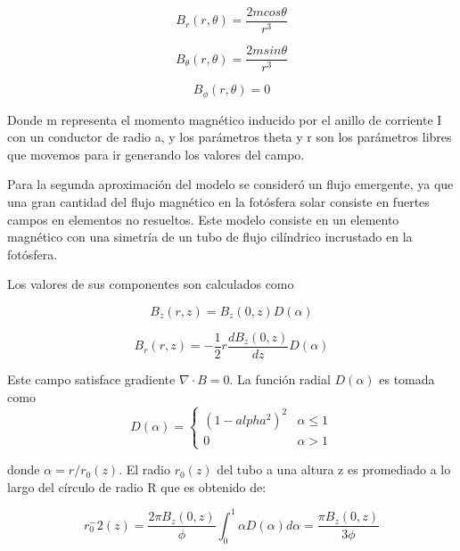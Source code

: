 \documentclass[9pt]{book}
\begin{document}
\begin{equation}
    B_r(r,\theta)=\frac{2mcos\theta}{r^3}
\end{equation}
  
\begin{equation}
    B_\theta(r,\theta)=\frac{2msin\theta}{r^3}
\end{equation}

\begin{equation}
    B_\phi(r,\theta)=0
\end{equation}

Donde m representa el momento magn\'etico inducido por el anillo de corriente I con un conductor de radio a, y los par\'ametros theta y r son los par\'ametros libres que movemos para ir generando los valores del campo.

Para la segunda aproximaci\'on del modelo se consider\'o un flujo emergente, ya que una gran cantidad del flujo magn\'etico en la fot\'osfera solar consiste en fuertes campos en elementos no resueltos. Este modelo consiste en un elemento magn\'etico con una simetr\'ia de un tubo de flujo cil\'indrico incrustado en la fot\'osfera.

Los valores de sus componentes son calculados como

\begin{equation}
B_z(r,z)=B_z(0,z)D(\alpha)
\end{equation}

\begin{equation}
B_r(r,z)=-\frac{1}{2}r\frac{dB_z(0,z)}{dz}D(\alpha)
\end{equation}

Este campo satisface gradiente $ \nabla \cdot B = 0 $. La funci\'on radial $D(\alpha)$ es tomada como
\begin{equation}
 D(\alpha) = 
    \begin{cases}
        (1-alpha^2)^2 & \alpha \leq 1 \\
        0   & \alpha > 1
    \end{cases}
\end{equation}

donde $\alpha = r/r_0(z)$. El radio $r_0(z)$ del tubo a una altura z es promediado a lo largo del c\'irculo de radio R que es obtenido de:

\begin{equation} \label{r_flujo_emergente}
r_0^-2(z) = \frac{2\pi B_z(0,z)}{\phi} \int_{0}^{1} \alpha D(\alpha) d\alpha = \frac{\pi B_z(0,z)}{3 \phi}
\end{equation}
\end{document}
